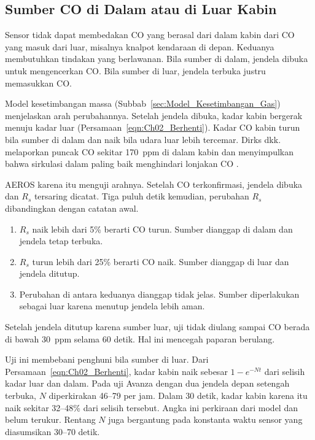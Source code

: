 
    \subsection{Sumber CO di Dalam atau di Luar Kabin}
    \label{sec:Sumber_CO_Dalam_Luar}

    Sensor tidak dapat membedakan CO yang berasal dari dalam kabin dari CO yang masuk dari luar, misalnya knalpot kendaraan di depan. Keduanya membutuhkan tindakan yang berlawanan. Bila sumber di dalam, jendela dibuka untuk mengencerkan CO. Bila sumber di luar, jendela terbuka justru memasukkan CO.

    Model kesetimbangan massa (Subbab~\ref{sec:Model_Kesetimbangan_Gas}) menjelaskan arah perubahannya. Setelah jendela dibuka, kadar kabin bergerak menuju kadar luar (Persamaan~\ref{eqn:Ch02_Berhenti}). Kadar CO kabin turun bila sumber di dalam dan naik bila udara luar lebih tercemar. Dirks dkk. melaporkan puncak CO sekitar 170~ppm di dalam kabin dan menyimpulkan bahwa sirkulasi dalam paling baik menghindari lonjakan CO \cite{dirks2018}.

    AEROS karena itu menguji arahnya. Setelah CO terkonfirmasi, jendela dibuka dan $R_s$ tersaring dicatat. Tiga puluh detik kemudian, perubahan $R_s$ dibandingkan dengan catatan awal.
    \begin{enumerate}
        \item $R_s$ naik lebih dari 5\% berarti CO turun. Sumber dianggap di dalam dan jendela tetap terbuka.
        \item $R_s$ turun lebih dari 25\% berarti CO naik. Sumber dianggap di luar dan jendela ditutup.
        \item Perubahan di antara keduanya dianggap tidak jelas. Sumber diperlakukan sebagai luar karena menutup jendela lebih aman.
    \end{enumerate}
    Setelah jendela ditutup karena sumber luar, uji tidak diulang sampai CO berada di bawah 30~ppm selama 60 detik. Hal ini mencegah paparan berulang.

    Uji ini membebani penghuni bila sumber di luar. Dari Persamaan~\ref{eqn:Ch02_Berhenti}, kadar kabin naik sebesar $1 - e^{-Nt}$ dari selisih kadar luar dan dalam. Pada uji Avanza dengan dua jendela depan setengah terbuka, $N$ diperkirakan 46--79 per jam. Dalam 30 detik, kadar kabin karena itu naik sekitar 32--48\% dari selisih tersebut. Angka ini perkiraan dari model dan belum terukur. Rentang $N$ juga bergantung pada konstanta waktu sensor yang diasumsikan 30--70 detik.

